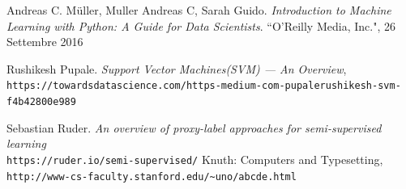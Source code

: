 \documentclass[12pt,italian]{report}
\begin{document}
\begin{thebibliography}{9}
	Andreas C. Müller, Muller Andreas C, Sarah Guido. 
	\textit{Introduction to Machine Learning with Python: A Guide for Data Scientists}. 
	``O'Reilly Media, Inc.", 26 Settembre 2016
	
 	Rushikesh Pupale. \textit{Support Vector Machines(SVM) — An Overview}, \\\texttt{https://towardsdatascience.com/https-medium-com-pupalerushikesh-svm-f4b42800e989}
 	
 	Sebastian Ruder. \textit{An overview of proxy-label approaches for semi-supervised learning}
 	\\\texttt{https://ruder.io/semi-supervised/}
	Knuth: Computers and Typesetting,
	\\\texttt{http://www-cs-faculty.stanford.edu/\~{}uno/abcde.html}
\end{thebibliography}
\end{document}
